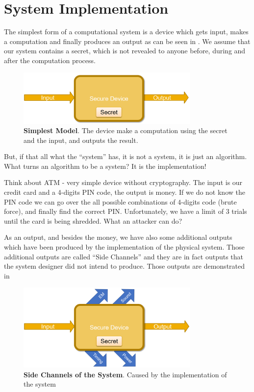 \section{System Implementation} \label{sec:SystemImpl}

The simplest form of a computational system is a device which gets input, makes
a computation and finally produces an output as can be seen in
. We assume that our system contains a secret, which is not
revealed to anyone before, during and after the computation process. 

\begin{figure}[!ht]
    \centering
    \includegraphics[width=0.8\textwidth]{images/ch1_Intro/Secure_device1.png}
    \caption{\textbf{Simplest Model}. The device make a computation using the secret and the input, and outputs the result.} \label{fig:SecDev1}
\end{figure}

But, if that all what the ``system'' has, it is not a system, it is just an
algorithm. What turns an algorithm to be a system? It is the implementation!

Think about ATM - very simple device without cryptography. The input is our
credit card and a 4-digits PIN code, the output is money. If we do not know the
PIN code we can go over the all possible combinations of 4-digits code (brute
force), and finally find the correct PIN. Unfortunately, we have a limit of 3
trials until the card is being shredded. What an attacker can do?

As an output, and besides the money, we have also some additional outputs which
have been produced by the implementation of the physical system. Those
additional outputs are called ``Side Channels'' and they are in fact outputs that the
system designer did not intend to produce. Those outputs are demonstrated in

\begin{figure}[!ht]
    \centering
    \includegraphics[width=0.8\textwidth]{images/ch1_Intro/Secure_device2.png}
    \caption{\textbf{Side Channels of the System}. Caused by the implementation of the system}
    \label{fig:SecDev2}
\end{figure}


